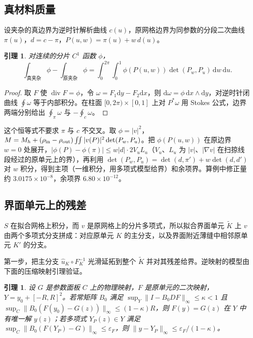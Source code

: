 \documentclass[11pt,a4paper,fontset=fandol]{ctexart}
\newcommand{\dd}{\mathrm{d}}
\theoremstyle{plain}
\newtheorem{lemma}[theorem]{引理}
\theoremstyle{definition}
\theoremstyle{remark}
\begin{document}
\subsection{真材料质量}
\label{sec:mass}

设夹杂的真边界为逆时针解析曲线 $c(u)$，原网格边界为同参数的分段二次曲线 $\pi(u)$，$d=c-\pi$，$P(u,w)=\pi(u)+w\,d(u)$。

\begin{lemma}
\label{lem:sweep}
对连续的分片 $C^1$ 函数 $\phi$，
\[
\int_{\text{真夹杂}}\phi-\int_{\text{原夹杂}}\phi=\int_0^{2\pi}\!\!\int_0^1\phi(P(u,w))\det(P_w,P_u)\,\dd w\,\dd u .
\]
\end{lemma}

\begin{proof}
取 $F$ 使 $\operatorname{div}F=\phi$，令 $\omega=F_1\dd y-F_2\dd x$，则 $\dd\omega=\phi\,\dd x\wedge\dd y$，对逆时针闭曲线 $\oint\omega$ 等于内部积分。在柱面 $[0,2\pi)\times[0,1]$ 上对 $P^*\omega$ 用 Stokes 公式，边界两端分别给出 $\oint_\pi\omega$ 与 $-\oint_c\omega$。
\end{proof}

这个恒等式不要求 $\pi$ 与 $c$ 不交叉。取 $\phi=|v|^2$，$M=M_h+(\rho_{\rm in}-\rho_{\rm out})\iint|v(P)|^2\det(P_w,P_u)$。把 $\phi(P(u,w))$ 在原边界 $w=0$ 处展开，$|\phi(P)-\phi(\pi)|\le w|d|\cdot2V_uL_u$（$V_u$、$L_u$ 为 $|v|$、$|\nabla v|$ 在扫掠线段经过的原单元上的界），再利用 $\det(P_w,P_u)=\det(d,\pi')+w\det(d,d')$ 对 $w$ 积分，得到主项（一维积分，用多项式模型给界）和余项界。算例中修正量约 $3.0175\times10^{-8}$，余项界 $6.80\times10^{-12}$。

\subsection{界面单元上的残差}
\label{sec:interface}

$S$ 在拟合网格上积分，而 $v$ 是原网格上的分片多项式，所以拟合界面单元 $\widetilde K$ 上 $v$ 由两个多项式分支拼成：对应原单元 $K$ 的主分支，以及界面附近薄缝中相邻原单元 $K'$ 的分支。

第一步，把主分支 $\widehat u_K\circ F_K^{-1}$ 光滑延拓到整个 $\widetilde K$ 并对其残差给界。逆映射的模型由下面的压缩映射引理验证。

\begin{lemma}
\label{lem:inverse}
设 $G$ 是参数面板 $C$ 上的物理映射，$F$ 是原单元的二次映射，$Y=y_0+[-R,R]^2$。若常矩阵 $B_0$ 满足 $\sup_Y\|I-B_0DF\|_\infty\le\kappa<1$ 且 $\sup_C\|B_0(F(y_0)-G(z))\|_\infty\le(1-\kappa)R$，则 $F(y)=G(z)$ 在 $Y$ 中有唯一解 $y(z)$；若多项式 $Y_P(z)\in Y$ 满足 $\sup_C\|B_0(F(Y_P)-G)\|_\infty\le\varepsilon_F$，则 $\|y-Y_P\|_\infty\le\varepsilon_F/(1-\kappa)$。
\end{lemma}
\end{document}

